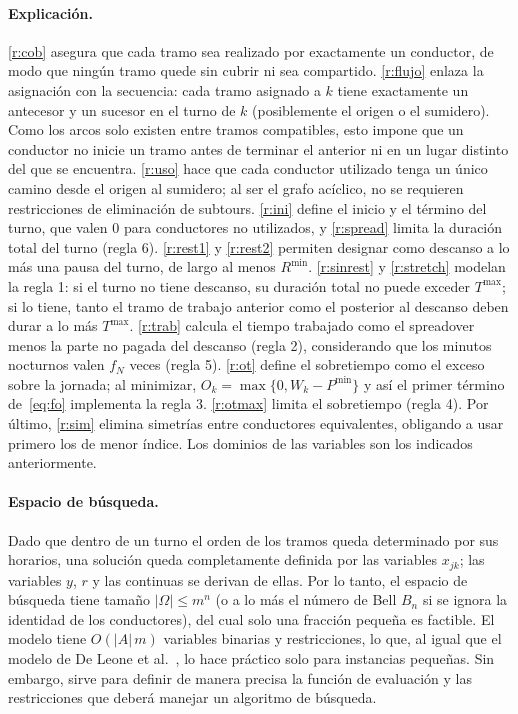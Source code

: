 \documentclass[letter, 10pt]{article}
\begin{document}
\paragraph{Explicación.}
\eqref{r:cob} asegura que cada tramo sea realizado por exactamente un conductor, de modo que ningún tramo quede sin cubrir ni sea compartido. \eqref{r:flujo} enlaza la asignación con la secuencia: cada tramo asignado a $k$ tiene exactamente un antecesor y un sucesor en el turno de $k$ (posiblemente el origen o el sumidero). Como los arcos solo existen entre tramos compatibles, esto impone que un conductor no inicie un tramo antes de terminar el anterior ni en un lugar distinto del que se encuentra. \eqref{r:uso} hace que cada conductor utilizado tenga un único camino desde el origen al sumidero; al ser el grafo acíclico, no se requieren restricciones de eliminación de subtours. \eqref{r:ini} define el inicio y el término del turno, que valen 0 para conductores no utilizados, y \eqref{r:spread} limita la duración total del turno (regla 6). \eqref{r:rest1} y \eqref{r:rest2} permiten designar como descanso a lo más una pausa del turno, de largo al menos $R^{\min}$. \eqref{r:sinrest} y \eqref{r:stretch} modelan la regla 1: si el turno no tiene descanso, su duración total no puede exceder $T^{\max}$; si lo tiene, tanto el tramo de trabajo anterior como el posterior al descanso deben durar a lo más $T^{\max}$. \eqref{r:trab} calcula el tiempo trabajado como el spreadover menos la parte no pagada del descanso (regla 2), considerando que los minutos nocturnos valen $f_N$ veces (regla 5). \eqref{r:ot} define el sobretiempo como el exceso sobre la jornada; al minimizar, $O_k=\max\{0,W_k-P^{\min}\}$ y así el primer término de~\eqref{eq:fo} implementa la regla 3. \eqref{r:otmax} limita el sobretiempo (regla 4). Por último, \eqref{r:sim} elimina simetrías entre conductores equivalentes, obligando a usar primero los de menor índice. Los dominios de las variables son los indicados anteriormente.

\paragraph{Espacio de búsqueda.}
Dado que dentro de un turno el orden de los tramos queda determinado por sus horarios, una solución queda completamente definida por las variables $x_{jk}$; las variables $y$, $r$ y las continuas se derivan de ellas. Por lo tanto, el espacio de búsqueda tiene tamaño $|\Omega|\leq m^{n}$ (o a lo más el número de Bell $B_n$ si se ignora la identidad de los conductores), del cual solo una fracción pequeña es factible. El modelo tiene $O(|A|\,m)$ variables binarias y restricciones, lo que, al igual que el modelo de De Leone et al.~\cite{DeLeone2011a}, lo hace práctico solo para instancias pequeñas. Sin embargo, sirve para definir de manera precisa la función de evaluación y las restricciones que deberá manejar un algoritmo de búsqueda.
\end{document}
